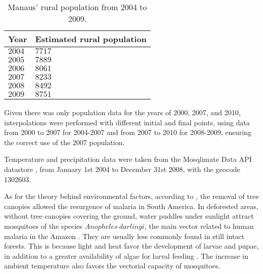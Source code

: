 \documentclass[a4paper,fleqn]{cas-dc}
\begin{document}
\begin{table}[width=.9\linewidth,cols=4,pos=h]
\caption{Manaus' rural population from 2004 to 2009.}\label{tbl1}
\begin{tabular*}{\tblwidth}{@{} LL@{} } %
\toprule
\textbf{Year}  & \textbf{Estimated rural population}\\
\midrule
$2004$ & $7717$ \\
 $2005$ & $7889$ \\
$2006$ & $8061$ \\
$2007$ & $8233$ \\
$2008$ & $8492$ \\
$2009$ & $8751$ \\
\bottomrule
\end{tabular*}
\end{table}


Given there was only population data for the years of 2000, 2007, and 2010, 
interpolations were performed with different initial and final 
points, using data from 2000 to 2007 for 2004-2007 and from 2007 
to 2010 for 2008-2009, ensuring the correct use of the 2007 population.

Temperature and precipitation data were taken from the Mosqlimate Data API datastore \cite{MosqlimateAPI}, from January 1st 2004 to December 31st 2008, with the geocode 1302603.

As for the theory behind environmental factors, 
according to \cite{Norris2004}, the removal of tree canopies allowed 
the resurgence of malaria in South America. In deforested areas, 
without tree canopies covering the ground, water puddles under sunlight 
attract mosquitoes of the species $Anopheles \ darlingi$, the main vector 
related to human malaria in the Amazon \cite{infoAnopheles}. They are 
usually less commonly found in still intact forests. This is 
because light and heat favor the development of larvae and 
pupae, in addition to a greater availability of algae for 
larval feeding \cite{article_alteracoesambientais}. The increase 
in ambient temperature also favors the vectorial capacity of 
mosquitoes. 
\end{document}
